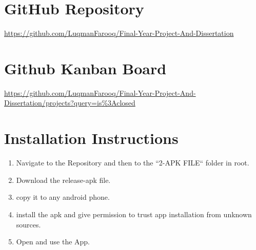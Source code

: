 \section{GitHub Repository}
\url{https://github.com/LuqmanFarooq/Final-Year-Project-And-Dissertation}

\section{Github Kanban Board}
\url{https://github.com/LuqmanFarooq/Final-Year-Project-And-Dissertation/projects?query=is%3Aclosed}


\section{Installation Instructions}
\begin{enumerate}
    \item Navigate to the Repository and then to the ``2-APK FILE`` folder in root.
    \item Download the release-apk file.
    \item copy it to any android phone.
    \item install the apk and give permission to trust app installation from unknown sources.
    \item Open and use the App.
\end{enumerate}
\printbibliography